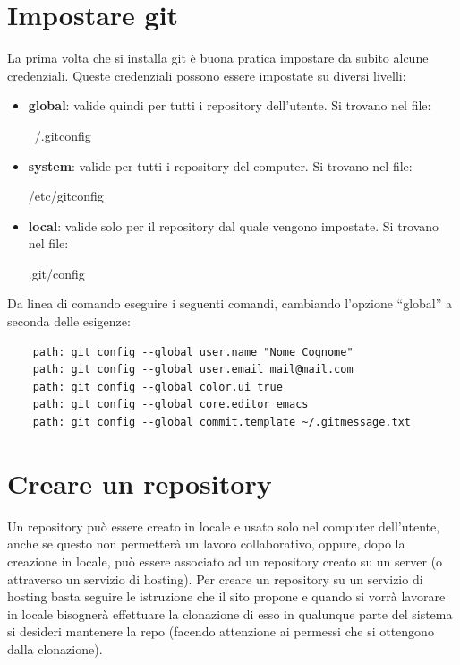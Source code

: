 

\newpage \clearpage
\section{Impostare git} %
\label{sec:impostare_git}
La prima volta che si installa git è buona pratica impostare da subito alcune credenziali. \newline
Queste credenziali possono essere impostate su diversi livelli:
	\begin{itemize}
		\item \textbf{global}: valide quindi per tutti i repository dell'utente. Si trovano nel file:
			\begin{center}
				~/.gitconfig
			\end{center}
		\item \textbf{system}: valide per tutti i repository del computer. Si trovano nel file:
			\begin{center}
				/etc/gitconfig
			\end{center}
		\item \textbf{local}: valide solo per il repository dal quale vengono impostate. Si trovano nel file:
			\begin{center}
				.git/config
			\end{center}
	\end{itemize}
Da linea di comando eseguire i seguenti comandi, cambiando l'opzione ``global'' a seconda delle esigenze:
	\begin{verbatim}
	path: git config --global user.name "Nome Cognome"
	path: git config --global user.email mail@mail.com
	path: git config --global color.ui true
	path: git config --global core.editor emacs
	path: git config --global commit.template ~/.gitmessage.txt
	\end{verbatim}


\newpage \clearpage
\section{Creare un repository} %
\label{sec:creare_un_repository}
Un repository può essere creato in locale e usato solo nel computer dell'utente, anche se questo non permetterà un lavoro collaborativo, oppure, dopo la creazione in locale, può essere associato ad un repository creato su un server (o attraverso un servizio di hosting). \newline
Per creare un repository su un servizio di hosting basta seguire le istruzione che il sito propone e quando si vorrà lavorare in locale bisognerà effettuare la clonazione di esso in qualunque parte del sistema si desideri mantenere la repo (facendo attenzione ai permessi che si ottengono dalla clonazione).
